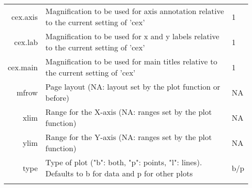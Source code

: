 \begin{table}[h]
\begin{center}
\begin{tabular}{r p{10cm} p{3cm}}
{\sf cex.axis} & Magnification to be used for axis annotation relative to the current setting of 'cex' & 1 \\
{\sf cex.lab} & Magnification to be used for x and y labels relative to the current setting of 'cex' & 1 \\
{\sf cex.main} & Magnification to be used for main titles relative to the current setting of 'cex' & 1 \\
{\sf mfrow} & Page layout (NA: layout set by the plot function or before) & NA \\
{\sf xlim} & Range for the X-axis (NA: ranges set by the plot function) & NA \\
{\sf ylim} & Range for the Y-axis (NA: ranges set by the plot function) & NA \\
{\sf type} & Type of plot ("b": both, "p": points, "l": lines). Defaults to b for data and p for other plots & b/p \\
& & \\
\hline
\end{tabular} 
\end{center}
\end{table} 
\clearpage


